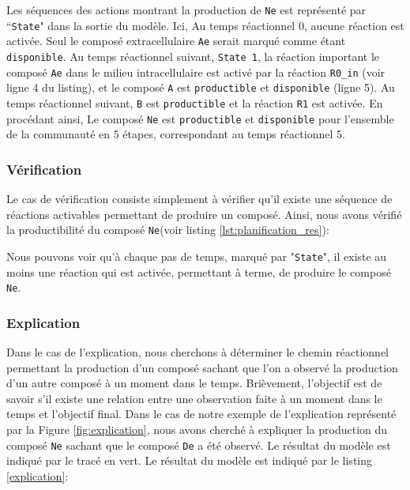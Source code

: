 \documentclass[../main.tex]{subfiles}
\begin{document}
Les séquences des actions montrant la production de \texttt{Ne} est représenté par “\texttt{State}" dans la sortie du modèle. Ici, Au temps réactionnel 0, aucune réaction est activée. Seul le composé extracellulaire \texttt{Ae} serait marqué comme étant \texttt{disponible}. Au temps réactionnel suivant, \texttt{State 1}, la réaction important le composé \texttt{Ae} dans le milieu intracellulaire est activé par la réaction \texttt{R0\_in} (voir ligne 4 du listing), et le composé \texttt{A} est \texttt{productible} et \texttt{disponible} (ligne 5). Au temps réactionnel suivant, \texttt{B} est \texttt{productible} et la réaction \texttt{R1} est activée. En procédant ainsi, Le composé \texttt{Ne} est \texttt{productible} et \texttt{disponible} pour l'ensemble de la communauté en 5 étapes, correspondant au temps réactionnel 5.


\subsubsection*{Vérification}
Le cas de vérification consiste simplement à vérifier qu'il existe une séquence de réactions activables permettant de produire un composé. Ainsi, nous avons vérifié la productibilité du composé \texttt{Ne}(voir listing \ref{lst:planification_res}):

Nous pouvons voir qu'à chaque pas de temps, marqué par "\texttt{State}", il existe au moins une réaction qui est activée, permettant à terme, de produire le composé \texttt{Ne}.


\subsubsection*{Explication}
Dans le cas de l'explication, nous cherchons à déterminer le chemin réactionnel permettant la production d'un composé sachant que l'on a observé la production d'un autre composé à un moment dans le temps. Brièvement, l'objectif est de savoir s’il existe une relation entre une observation faite à un moment dans le temps et l'objectif final. Dans le cas de notre exemple de l'explication représenté par la Figure \ref{fig:explication}, nous avons cherché à expliquer la production du composé \texttt{Ne} sachant que le composé \texttt{De} a été observé. Le résultat du modèle est indiqué par le tracé en vert. Le résultat du modèle est indiqué par le listing \ref{explication}:
\end{document}
